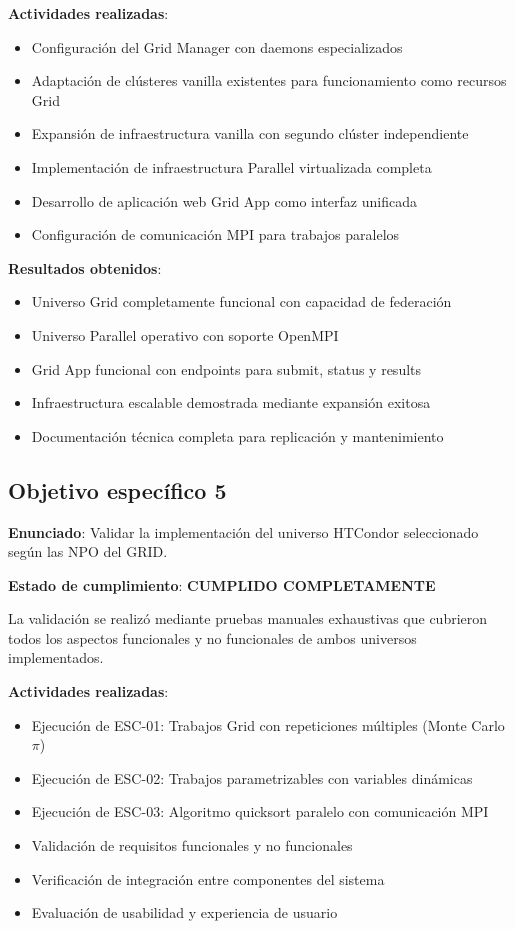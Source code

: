\textbf{Actividades realizadas}:
\begin{itemize}
    \item Configuración del Grid Manager con daemons especializados
    \item Adaptación de clústeres vanilla existentes para funcionamiento como recursos Grid
    \item Expansión de infraestructura vanilla con segundo clúster independiente
    \item Implementación de infraestructura Parallel virtualizada completa
    \item Desarrollo de aplicación web Grid App como interfaz unificada
    \item Configuración de comunicación MPI para trabajos paralelos
\end{itemize}

\textbf{Resultados obtenidos}:
\begin{itemize}
    \item Universo Grid completamente funcional con capacidad de federación
    \item Universo Parallel operativo con soporte OpenMPI
    \item Grid App funcional con endpoints para submit, status y results
    \item Infraestructura escalable demostrada mediante expansión exitosa
    \item Documentación técnica completa para replicación y mantenimiento
\end{itemize}

\subsection{Objetivo específico 5}
\noindent

\textbf{Enunciado}: Validar la implementación del universo HTCondor seleccionado según las NPO del GRID.

\textbf{Estado de cumplimiento}: \textbf{CUMPLIDO COMPLETAMENTE}

La validación se realizó mediante pruebas manuales exhaustivas que cubrieron todos los aspectos funcionales y no funcionales de ambos universos implementados.

\textbf{Actividades realizadas}:
\begin{itemize}
    \item Ejecución de ESC-01: Trabajos Grid con repeticiones múltiples (Monte Carlo $\pi$)
    \item Ejecución de ESC-02: Trabajos parametrizables con variables dinámicas
    \item Ejecución de ESC-03: Algoritmo quicksort paralelo con comunicación MPI
    \item Validación de requisitos funcionales y no funcionales
    \item Verificación de integración entre componentes del sistema
    \item Evaluación de usabilidad y experiencia de usuario
\end{itemize}

